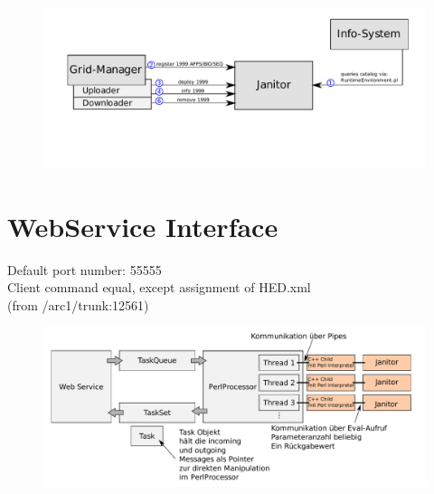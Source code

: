 \begin{figure}[!h]
  \begin{center}
    \includegraphics[width=12cm]{images/janitor_integration_2nd_edition.pdf}
    \mycaption{}{}
    \label{fig:RE_states}
  \end{center}
\end{figure}

\section{WebService Interface}

Default port number: 55555\\
Client command equal, except assignment of HED.xml\\
 (from /arc1/trunk:12561)

\begin{figure}[!h]
  \begin{center}
    \includegraphics[width=12cm]{images/WS_structure.pdf}
    \label{fig:RE_states}
  \end{center}
\end{figure}

